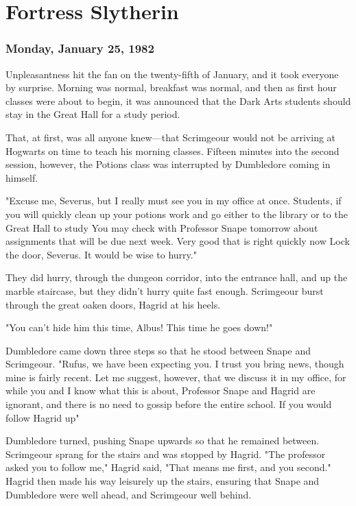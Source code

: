 
\chapter{Fortress Slytherin}

\subsection{Monday, January 25, 1982}

Unpleasantness hit the fan on the twenty-fifth of January, and it took everyone by surprise. Morning was normal, breakfast was normal, and then as first hour classes were about to begin, it was announced that the Dark Arts students should stay in the Great Hall for a study period.

That, at first, was all anyone knew—that Scrimgeour would not be arriving at Hogwarts on time to teach his morning classes. Fifteen minutes into the second session, however, the Potions class was interrupted by Dumbledore coming in himself.

"Excuse me, Severus, but I really must see you in my office at once. Students, if you will quickly clean up your potions work and go either to the library or to the Great Hall to study{\el} You may check with Professor Snape tomorrow about assignments that will be due next week. Very good{\el} that is right{\el} quickly now{\el} Lock the door, Severus. It would be wise to hurry."

They did hurry, through the dungeon corridor, into the entrance hall, and up the marble staircase, but they didn't hurry quite fast enough. Scrimgeour burst through the great oaken doors, Hagrid at his heels.

"You can't hide him this time, Albus! This time he goes down!"

Dumbledore came down three steps so that he stood between Snape and Scrimgeour. "Rufus, we have been expecting you. I trust you bring news, though mine is fairly recent. Let me suggest, however, that we discuss it in my office, for while you and I know what this is about, Professor Snape and Hagrid are ignorant, and there is no need to gossip before the entire school. If you would follow Hagrid up{\el}"

Dumbledore turned, pushing Snape upwards so that he remained between. Scrimgeour sprang for the stairs and was stopped by Hagrid. "The professor asked you to follow me," Hagrid said, "That means me first, and you second." Hagrid then made his way leisurely up the stairs, ensuring that Snape and Dumbledore were well ahead, and Scrimgeour well behind.

